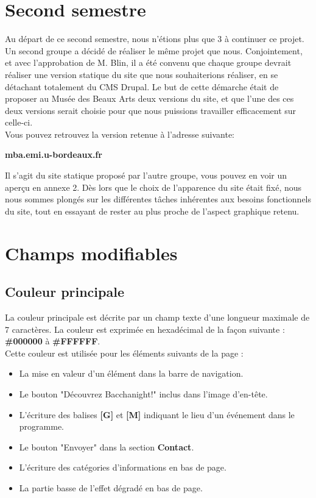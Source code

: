 \documentclass[11pt]{report}
\begin{document}
\vspace{0.5cm}

\section{Second semestre}

Au départ de ce second semestre, nous n'étions plus que 3 à continuer ce projet.
Un second groupe a décidé de réaliser le même projet que nous. Conjointement,
et avec l'approbation de M. Blin, il a été convenu que chaque groupe devrait
réaliser une version statique du site que nous souhaiterions réaliser, en se
détachant totalement du CMS Drupal. Le but de cette démarche était de proposer au
Musée des Beaux Arts deux versions du site, et que l'une des ces deux versions serait
choisie pour que nous puissions travailler efficacement sur celle-ci.\\
Vous pouvez retrouvez la version retenue à l'adresse suivante:

\vspace{0.5cm}

\textbf{mba.emi.u-bordeaux.fr}\\

\par
Il s'agit du site statique proposé par l'autre groupe, vous pouvez en voir un
aperçu en annexe 2. Dès lors que le choix de l'apparence du site était fixé,
nous nous sommes plongés sur les différentes tâches inhérentes aux besoins
fonctionnels du site, tout en essayant de rester au plus proche de l'aspect
graphique retenu.

\newpage
\section{Champs modifiables}

\subsection{Couleur principale}

La couleur principale est décrite par un champ texte d'une longueur maximale de
7 caractères. La couleur est exprimée en hexadécimal de la façon suivante :
\textbf{\#000000} à \textbf{\#FFFFFF}. \\
Cette couleur est utilisée pour les éléments suivants de la page :
\begin{itemize}
	\item La mise en valeur d'un élément dans la barre de navigation.
	\item Le bouton "Découvrez Bacchanight!" inclus dans l'image d'en-tête.
	\item L'écriture des balises \textbf{[G]} et \textbf{[M]} indiquant le lieu d'un événement dans le programme.
	\item Le bouton "Envoyer" dans la section \textbf{Contact}.
	\item L'écriture des catégories d'informations en bas de page.
	\item La partie basse de l'effet dégradé en bas de page.
\end{itemize}
\end{document}
